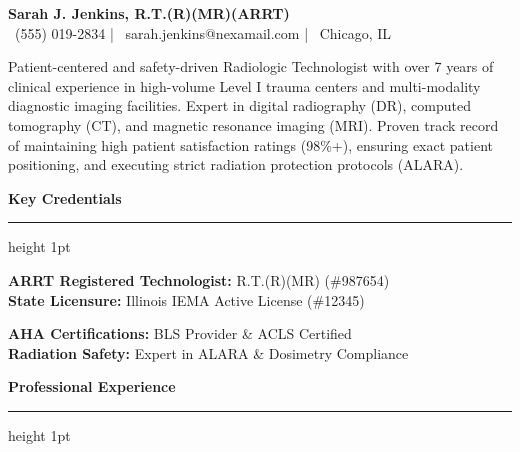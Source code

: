 \documentclass[10pt,letterpaper]{article}
\newcommand{\resumesection}[1]{%
  \vspace{0.6em}%
  {\large\bfseries\color{brandblue} #1}%
  \nopagebreak[4]\par\vspace{0.2em}%
  {\color{brandblue}\hrule height 1pt}%
  \vspace{0.4em}%
}
\begin{document}
\begin{center}
  {\Huge \bfseries \color{brandblue} Sarah J. Jenkins, R.T.(R)(MR)(ARRT)} \\
  \vspace{0.4em}
  {\color{charcoal} \faPhone\ (555) 019-2834 \quad | \quad \faEnvelope\ sarah.jenkins@nexamail.com \quad | \quad \faMapMarker\ Chicago, IL}
\end{center}

\vspace{0.4em}

Patient-centered and safety-driven Radiologic Technologist with over 7 years of clinical experience in high-volume Level I trauma centers and multi-modality diagnostic imaging facilities. Expert in digital radiography (DR), computed tomography (CT), and magnetic resonance imaging (MRI). Proven track record of maintaining high patient satisfaction ratings (98\%+), ensuring exact patient positioning, and executing strict radiation protection protocols (ALARA).

\vspace{0.4em}

\resumesection{Key Credentials}
\begin{tcolorbox}[
  colback=brandblue!6,
  colframe=brandblue,
  arc=2pt,
  boxrule=0.8pt,
  top=6pt,
  bottom=6pt,
  left=8pt,
  right=8pt,
  boxsep=0pt,
  width=\textwidth
]
\begin{minipage}[t]{0.49\textwidth}
  \textbf{ARRT Registered Technologist:} R.T.(R)(MR) (\#987654) \\
  \textbf{State Licensure:} Illinois IEMA Active License (\#12345)
\end{minipage}\hfill
\begin{minipage}[t]{0.49\textwidth}
  \textbf{AHA Certifications:} BLS Provider \& ACLS Certified \\
  \textbf{Radiation Safety:} Expert in ALARA \& Dosimetry Compliance
\end{minipage}
\end{tcolorbox}

\vspace{0.4em}

\resumesection{Professional Experience}
\end{document}
